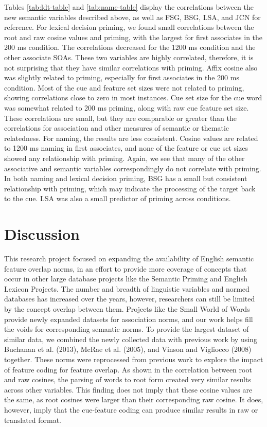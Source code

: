 \documentclass[english,,man]{apa6}
\theoremstyle{definition}
\theoremstyle{definition}
\theoremstyle{definition}
\theoremstyle{remark}
\begin{document}
Tables \ref{tab:ldt-table} and \ref{tab:name-table} display the
correlations between the new semantic variables described above, as well
as FSG, BSG, LSA, and JCN for reference. For lexical decision priming,
we found small correlations between the root and raw cosine values and
priming, with the largest for first associates in the 200 ms condition.
The correlations decreased for the 1200 ms condition and the other
associate SOAs. These two variables are highly correlated, therefore, it
is not surprising that they have similar correlations with priming.
Affix cosine also was slightly related to priming, especially for first
associates in the 200 ms condition. Most of the cue and feature set
sizes were not related to priming, showing correlations close to zero in
most instances. Cue set size for the cue word was somewhat related to
200 ms priming, along with raw cue feature set size. These correlations
are small, but they are comparable or greater than the correlations for
association and other measures of semantic or thematic relatedness. For
naming, the results are less consistent. Cosine values are related to
1200 ms naming in first associates, and none of the feature or cue set
sizes showed any relationship with priming. Again, we see that many of
the other associative and semantic variables correspondingly do not
correlate with priming. In both naming and lexical decision priming, BSG
has a small but consistent relationship with priming, which may indicate
the processing of the target back to the cue. LSA was also a small
predictor of priming across conditions.

\hypertarget{discussion}{%
\section{Discussion}\label{discussion}}

This research project focused on expanding the availability of English
semantic feature overlap norms, in an effort to provide more coverage of
concepts that occur in other large database projects like the Semantic
Priming and English Lexicon Projects. The number and breadth of
linguistic variables and normed databases has increased over the years,
however, researchers can still be limited by the concept overlap between
them. Projects like the Small World of Words provide newly expanded
datasets for association norms, and our work helps fill the voids for
corresponding semantic norms. To provide the largest dataset of similar
data, we combined the newly collected data with previous work by using
Buchanan et al. (2013), McRae et al. (2005), and Vinson and Vigliocco
(2008) together. These norms were reprocessed from previous work to
explore the impact of feature coding for feature overlap. As shown in
the correlation between root and raw cosines, the parsing of words to
root form created very similar results across other variables. This
finding does not imply that these cosine values are the same, as root
cosines were larger than their corresponding raw cosine. It does,
however, imply that the cue-feature coding can produce similar results
in raw or translated format.
\end{document}
